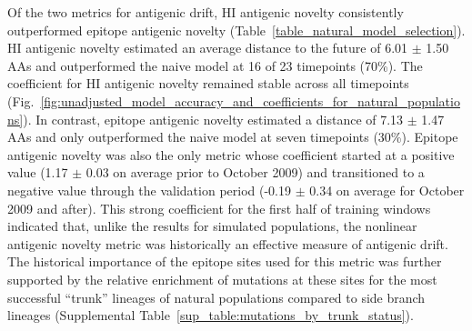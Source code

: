 Of the two metrics for antigenic drift, HI antigenic novelty consistently outperformed epitope antigenic novelty (Table~\ref{table_natural_model_selection}).
HI antigenic novelty estimated an average distance to the future of 6.01 $\pm$ 1.50 AAs and outperformed the naive model at 16 of 23 timepoints (70\%).
The coefficient for HI antigenic novelty remained stable across all timepoints (Fig.~\ref{fig:unadjusted_model_accuracy_and_coefficients_for_natural_populations}).
In contrast, epitope antigenic novelty estimated a distance of 7.13 $\pm$ 1.47 AAs and only outperformed the naive model at seven timepoints (30\%).
Epitope antigenic novelty was also the only metric whose coefficient started at a positive value (1.17 $\pm$ 0.03 on average prior to October 2009) and transitioned to a negative value through the validation period (-0.19 $\pm$ 0.34 on average for October 2009 and after).
This strong coefficient for the first half of training windows indicated that, unlike the results for simulated populations, the nonlinear antigenic novelty metric was historically an effective measure of antigenic drift.
The historical importance of the epitope sites used for this metric was further supported by the relative enrichment of mutations at these sites for the most successful ``trunk'' lineages of natural populations compared to side branch lineages (Supplemental Table~\ref{sup_table:mutations_by_trunk_status}).

